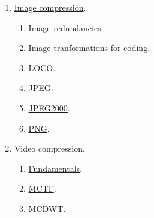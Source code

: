 \begin{enumerate}
\item \href{https://vicente-gonzalez-ruiz.github.io/vorbis/}{Image compression}.
  \begin{enumerate}
  \item \href{https://vicente-gonzalez-ruiz.github.io/image_redundancies/}{Image redundancies}.
  \item \href{https://vicente-gonzalez-ruiz.github.io/image_transformations_for_coding/}{Image tranformations for coding}.
  \item \href{https://cdn.rawgit.com/vicente-gonzalez-ruiz/LOCO/master/index.html}{LOCO}.
  \item \href{https://cdn.rawgit.com/vicente-gonzalez-ruiz/JPEG/master/index.html}{JPEG}.
  \item \href{https://cdn.rawgit.com/vicente-gonzalez-ruiz/JPEG2000/master/index.html}{JPEG2000}.
  \item \href{}{PNG}.
  \end{enumerate}
\item Video compression.
  \begin{enumerate}
  \item \href{https://cdn.rawgit.com/vicente-gonzalez-ruiz/video_compression/master/index.html}{Fundamentals}.
  \item \href{https://github.com/vicente-gonzalez-ruiz/MCTF-video-coding}{MCTF}.
  \item \href{https://github.com/vicente-gonzalez-ruiz/MCDWT}{MCDWT}.
  \end{enumerate}
\end{enumerate}


